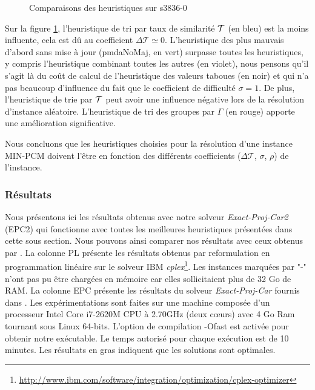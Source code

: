 \begin{figure}
\centering
	\begin{minipage}[c]{0.49\linewidth}
	\centering
	
	\end{minipage}
	\begin{minipage}[c]{0.49\linewidth}
	\centering
	
	\end{minipage}
\caption{Comparaisons des heuristiques sur s3836-0}
\label{compares3836}
\end{figure}

Sur la figure \ref{compares3836}, l'heuristique de tri par taux de similarité $\cal{T}$ (en bleu) est la moins influente, cela est dû au coefficient $\Delta\mathcal{T} \simeq 0$. L'heuristique des plus mauvais d'abord sans mise à jour (pmdaNoMaj, en vert) surpasse toutes les heuristiques, y compris l'heuristique combinant toutes les autres (en violet), nous pensons qu'il s'agit là du coût de calcul de l'heuristique des valeurs taboues (en noir) et qui n'a pas beaucoup d'influence du fait que le coefficient de difficulté $\sigma = 1$. De plus, l'heuristique de trie par $\cal{T}$ peut avoir une influence négative lors de la résolution d'instance aléatoire. L'heuristique de tri des groupes par $\Gamma$ (en rouge) apporte une amélioration significative.

Nous concluons que les heuristiques choisies pour la résolution d'une instance MIN-PCM doivent l'être en fonction des différents coefficients ($\Delta\mathcal{T}$, $\sigma$, $\rho$) de l'instance.

\subsubsection{Résultats}
\label{sectionCompare}
Nous présentons ici les résultats obtenus avec notre solveur \emph{Exact-Proj-Car2} (EPC2) qui fonctionne avec toutes les meilleures heuristiques présentées dans cette sous section. Nous pouvons ainsi comparer nos résultats avec ceux obtenus par \cite{Chhel2013}.
La colonne PL présente les résultats obtenus par reformulation en programmation linéaire sur le solveur IBM \textit{cplex}\footnote{\url{http://www.ibm.com/software/integration/optimization/cplex-optimizer}}. Les instances marquées par "-" n'ont pas pu être chargées en mémoire car elles sollicitaient plus de 32 Go de RAM. La colonne EPC présente les résultats du solveur \emph{Exact-Proj-Car} fournis dans \cite{Chhel2013}. Les expérimentations sont faites sur une machine composée d'un processeur Intel Core i7-2620M CPU à 2.70GHz (deux cœurs) avec 4 Go Ram tournant sous Linux 64-bits. L'option de compilation -Ofast est activée pour obtenir notre exécutable. Le temps autorisé pour chaque exécution est de 10 minutes. Les résultats en gras indiquent que les solutions sont optimales.

